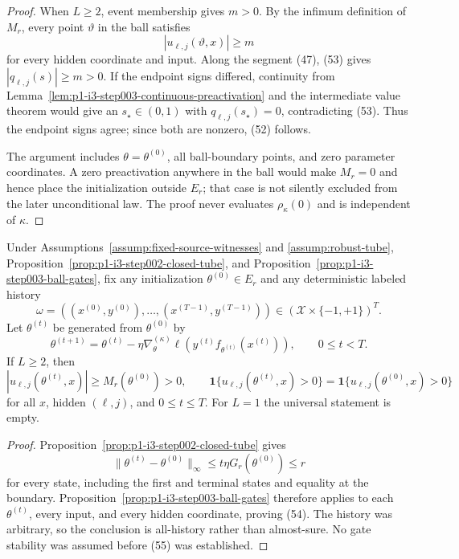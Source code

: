 \begin{proof}
When $L\geq2$, event membership gives $m>0$.  By the infimum definition of
$M_r$, every point $\vartheta$ in the ball satisfies
\[
|u_{\ell,j}(\vartheta,x)|\geq m
\tag{53}
\]
for every hidden coordinate and input.  Along the segment (47), (53) gives
$|q_{\ell,j}(s)|\geq m>0$.  If the endpoint signs differed, continuity from
Lemma~\ref{lem:p1-i3-step003-continuous-preactivation} and the intermediate
value theorem would give an $s_\star\in(0,1)$ with
$q_{\ell,j}(s_\star)=0$, contradicting (53).  Thus the endpoint signs agree;
since both are nonzero, (52) follows.

The argument includes $\theta=\theta^{(0)}$, all ball-boundary points, and
zero parameter coordinates.  A zero preactivation anywhere in the ball would
make $M_r=0$ and hence place the initialization outside $E_r$; that case is
not silently excluded from the later unconditional law.  The proof never
evaluates $\rho_\kappa(0)$ and is independent of $\kappa$.
\end{proof}

\begin{proposition}
\label{prop:p1-i3-step003-history-gates}
Under Assumptions~\ref{assump:fixed-source-witnesses} and
\ref{assump:robust-tube}, Proposition~\ref{prop:p1-i3-step002-closed-tube},
and Proposition~\ref{prop:p1-i3-step003-ball-gates}, fix any initialization
$\theta^{(0)}\in E_r$ and any deterministic labeled history
\[
\omega=((x^{(0)},y^{(0)}),\ldots,(x^{(T-1)},y^{(T-1)}))
\in(\mathcal X\times\{-1,+1\})^T.
\]
Let $\theta^{(t)}$ be generated from $\theta^{(0)}$ by
\[
\theta^{(t+1)}=\theta^{(t)}-\eta\nabla_\theta^{(\kappa)}
\ell\!\left(y^{(t)}f_{\theta^{(t)}}(x^{(t)})\right),
\qquad 0\leq t<T.
\]
If $L\geq2$, then
\[
|u_{\ell,j}(\theta^{(t)},x)|
\geq M_r(\theta^{(0)})>0,
\qquad
\mathbf1\{u_{\ell,j}(\theta^{(t)},x)>0\}
=\mathbf1\{u_{\ell,j}(\theta^{(0)},x)>0\}
\tag{54}
\]
for all $x$, hidden $(\ell,j)$, and $0\leq t\leq T$.  For $L=1$ the
universal statement is empty.
\end{proposition}

\begin{proof}
Proposition~\ref{prop:p1-i3-step002-closed-tube} gives
\[
\|\theta^{(t)}-\theta^{(0)}\|_\infty
\leq t\eta G_r(\theta^{(0)})\leq r
\tag{55}
\]
for every state, including the first and terminal states and equality at the
boundary.  Proposition~\ref{prop:p1-i3-step003-ball-gates} therefore applies
to each $\theta^{(t)}$, every input, and every hidden coordinate, proving
(54).  The history was arbitrary, so the conclusion is all-history rather
than almost-sure.  No gate stability was assumed before (55) was established.
\end{proof}

